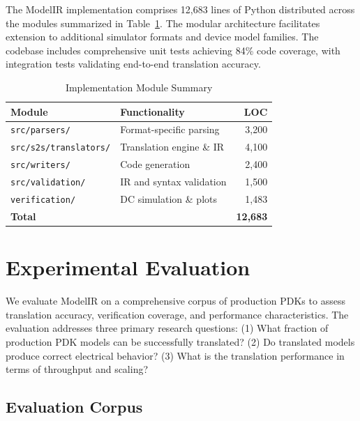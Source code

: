 \documentclass[conference]{IEEEtran}
\begin{document}
The ModelIR implementation comprises 12,683 lines of Python distributed across the modules summarized in Table~\ref{tab:implementation}. The modular architecture facilitates extension to additional simulator formats and device model families. The codebase includes comprehensive unit tests achieving 84\% code coverage, with integration tests validating end-to-end translation accuracy.

\begin{table}[!t]
\caption{Implementation Module Summary}
\label{tab:implementation}
\centering
\renewcommand{\arraystretch}{1.15}
\begin{tabular}{@{}llr@{}}
\toprule
\textbf{Module} & \textbf{Functionality} & \textbf{LOC} \\
\midrule
\texttt{src/parsers/} & Format-specific parsing & 3,200 \\
\texttt{src/s2s/translators/} & Translation engine \& IR & 4,100 \\
\texttt{src/writers/} & Code generation & 2,400 \\
\texttt{src/validation/} & IR and syntax validation & 1,500 \\
\texttt{verification/} & DC simulation \& plots & 1,483 \\
\midrule
\textbf{Total} & & \textbf{12,683} \\
\bottomrule
\end{tabular}
\end{table}

\section{Experimental Evaluation}
\label{sec:evaluation}

We evaluate ModelIR on a comprehensive corpus of production PDKs to assess translation accuracy, verification coverage, and performance characteristics. The evaluation addresses three primary research questions: (1) What fraction of production PDK models can be successfully translated? (2) Do translated models produce correct electrical behavior? (3) What is the translation performance in terms of throughput and scaling?

\subsection{Evaluation Corpus}
\end{document}
